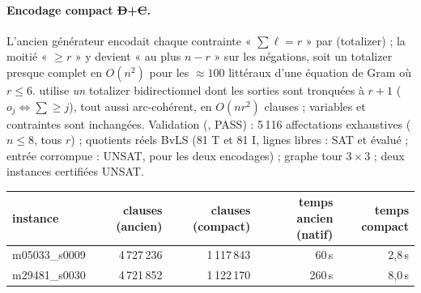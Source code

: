 \paragraph{Encodage compact \st{D}+\st{C}.} L'ancien générateur encodait chaque contrainte « $\sum\ell=r$ » par  (totalizer) ;
la moitié « $\ge r$ » y devient « au plus $n-r$ » sur les négations, soit un totalizer presque complet en $O(n^2)$ pour les $\approx100$ littéraux
d'une équation de Gram où $r\le6$.  utilise \emph{un} totalizer bidirectionnel dont les sorties sont tronquées à $r+1$
($o_j\Leftrightarrow\sum\ge j$), tout aussi arc-cohérent, en $O(nr^2)$ clauses ; variables et contraintes sont inchangées.
Validation (, PASS) : 5\,116 affectations exhaustives ($n\le8$, tous $r$) ; quotients réels BvLS (81 T et 81 I, lignes
libres : SAT et évalué ; entrée corrompue : UNSAT, pour les deux encodages) ; graphe tour $3\times3$ ; deux instances certifiées UNSAT.
\begin{center}\begin{tabular}{lrrrr}
instance & clauses (ancien) & clauses (compact) & temps ancien (natif) & temps compact\\\hline
m05033\_s0009 & 4\,727\,236 & 1\,117\,843 & 60\,s & 2{,}8\,s\\
m29481\_s0030 & 4\,721\,852 & 1\,122\,170 & 260\,s & 8{,}0\,s
\end{tabular}\end{center}

